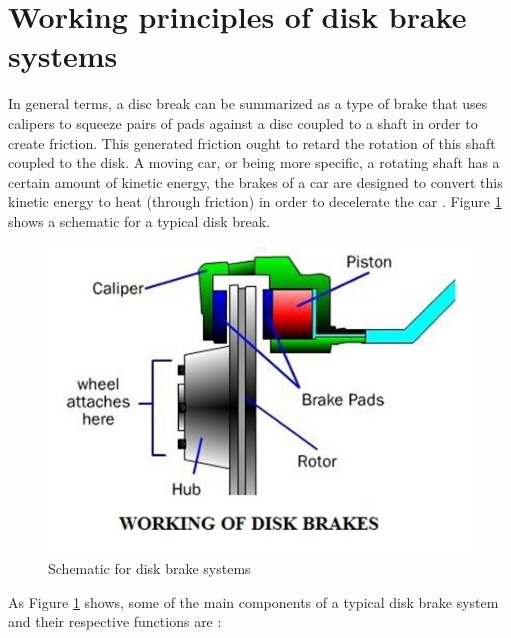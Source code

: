 \section{Working principles of disk brake systems}\label{sec:working-principles-of-disk-brake-systems}

		In general terms, a disc break can be summarized as a type of brake that uses calipers to squeeze pairs of pads against a disc coupled to a shaft in order to create friction. This generated friction ought to retard the rotation of this shaft coupled to the disk. A moving car, or being more specific, a rotating shaft has a certain amount of kinetic energy, the brakes of a car are designed to convert this kinetic energy to heat (through friction) in order to decelerate the car \cite{limpert1999brake}. Figure \ref{fig:working-of-disk-breaks} shows a schematic for a typical disk break.

		\begin{figure}[htbp]
			\centering
				\includegraphics[scale=0.55]{figuras/fig-disk_brake_working}
			\caption{Schematic for disk brake systems \cite{fig-working-of-disk-breaks}}
			\label{fig:working-of-disk-breaks}
		\end{figure}

		As Figure \ref{fig:working-of-disk-breaks} shows, some of the main components of a typical disk brake system and their respective functions are \cite{carparts-brake}:

